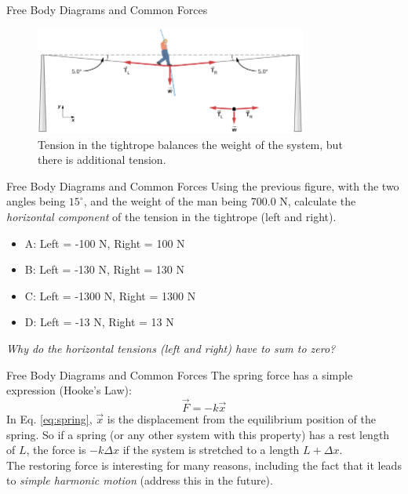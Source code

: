 \documentclass{beamer}
\begin{document}
\begin{frame}{Free Body Diagrams and Common Forces}
\begin{figure}
\centering
\includegraphics[width=0.8\textwidth]{figures/tightrope.png}
\caption{\label{fig:tightrope} Tension in the tightrope balances the weight of the system, but there is additional tension.}
\end{figure}
\end{frame}

\begin{frame}{Free Body Diagrams and Common Forces}
Using the previous figure, with the two angles being $15^{\circ}$, and the weight of the man being 700.0 N, calculate the \textit{horizontal component} of the tension in the tightrope (left and right).
\begin{itemize}
\item A: Left = -100 N, Right = 100 N
\item B: Left = -130 N, Right = 130 N
\item C: Left = -1300 N, Right = 1300 N
\item D: Left = -13 N, Right = 13 N
\end{itemize}
\textit{Why do the horizontal tensions (left and right) have to sum to zero?}
\end{frame}

\begin{frame}{Free Body Diagrams and Common Forces}
The spring force has a simple expression (Hooke's Law):
\begin{equation}
\vec{F} = -k\vec{x}
\label{eq:spring}
\end{equation}
In Eq. \ref{eq:spring}, $\vec{x}$ is the displacement from the equilibrium position of the spring.  So if a spring (or any other system with this property) has a rest length of $L$, the force is $-k\Delta x$ if the system is stretched to a length $L+\Delta x$. \\
\vspace{0.5cm}
The restoring force is interesting for many reasons, including the fact that it leads to \textit{simple harmonic motion} (address this in the future).
\end{frame}
\end{document}
